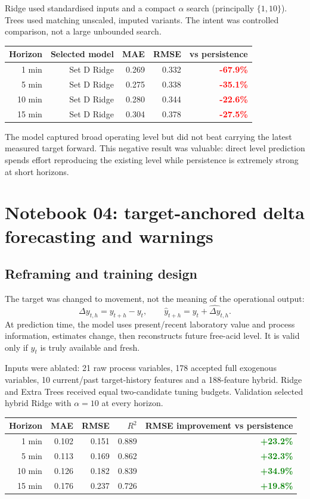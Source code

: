\documentclass[10pt,a4paper]{article}
\newcommand{\good}[1]{\textcolor{Green}{\textbf{#1}}}\newcommand{\warn}[1]{\textcolor{Gold}{\textbf{#1}}}\newcommand{\bad}[1]{\textcolor{Red}{\textbf{#1}}}\newcommand{\code}[1]{\texttt{\detokenize{#1}}}
\begin{document}
Ridge used standardised inputs and a compact $\alpha$ search (principally $\{1,10\}$). Trees used matching unscaled, imputed variants. The intent was controlled comparison, not a large unbounded search.
\begin{table}[H]\centering\begin{tabular}{rrrrr}\toprule
\textbf{Horizon} & \textbf{Selected model} & \textbf{MAE} & \textbf{RMSE} & \textbf{vs persistence}\\\midrule
1 min & Set D Ridge & 0.269 & 0.332 & \bad{-67.9\%}\\
5 min & Set D Ridge & 0.275 & 0.338 & \bad{-35.1\%}\\
10 min & Set D Ridge & 0.280 & 0.344 & \bad{-22.6\%}\\
15 min & Set D Ridge & 0.304 & 0.378 & \bad{-27.5\%}\\\bottomrule\end{tabular}\end{table}

The model captured broad operating level but did not beat carrying the latest measured target forward. This negative result was valuable: direct level prediction spends effort reproducing the existing level while persistence is extremely strong at short horizons.

\section{Notebook 04: target-anchored delta forecasting and warnings}
\subsection{Reframing and training design}
The target was changed to movement, not the meaning of the operational output:
\[
\Delta y_{t,h}=y_{t+h}-y_t,\qquad\hat y_{t+h}=y_t+\widehat{\Delta y}_{t,h}.
\]
At prediction time, the model uses present/recent laboratory value and process information, estimates change, then reconstructs future free-acid level. It is valid only if $y_t$ is truly available and fresh.

Inputs were ablated: 21 raw process variables, 178 accepted full exogenous variables, 10 current/past target-history features and a 188-feature hybrid. Ridge and Extra Trees received equal two-candidate tuning budgets. Validation selected hybrid Ridge with $\alpha=10$ at every horizon.
\begin{table}[H]\centering\begin{tabular}{rrrrr}\toprule
\textbf{Horizon} & \textbf{MAE} & \textbf{RMSE} & \textbf{$R^2$} & \textbf{RMSE improvement vs persistence}\\\midrule
1 min & 0.102 & 0.151 & 0.889 & \good{+23.2\%}\\
5 min & 0.113 & 0.169 & 0.862 & \good{+32.3\%}\\
10 min & 0.126 & 0.182 & 0.839 & \good{+34.9\%}\\
15 min & 0.176 & 0.237 & 0.726 & \good{+19.8\%}\\\bottomrule\end{tabular}\end{table}
\end{document}
